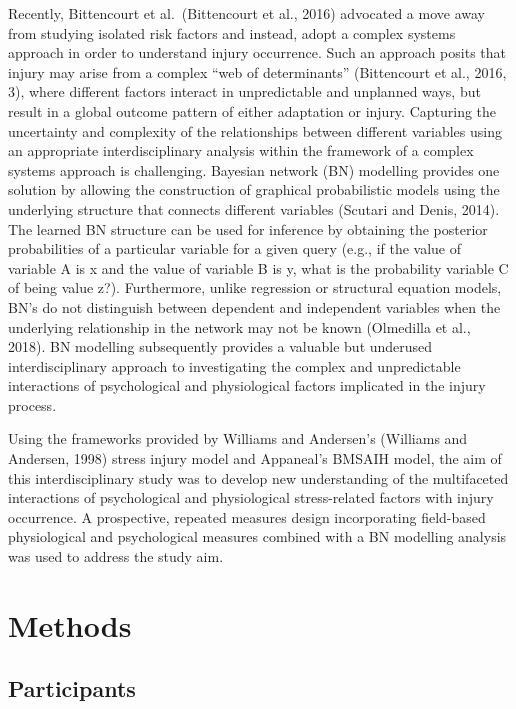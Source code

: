 \documentclass[
]{frontiersHLTH}
\begin{document}
Recently, Bittencourt et al.~(Bittencourt et al., 2016) advocated a move
away from studying isolated risk factors and instead, adopt a complex
systems approach in order to understand injury occurrence. Such an
approach posits that injury may arise from a complex ``web of
determinants'' (Bittencourt et al., 2016, 3), where different factors
interact in unpredictable and unplanned ways, but result in a global
outcome pattern of either adaptation or injury. Capturing the
uncertainty and complexity of the relationships between different
variables using an appropriate interdisciplinary analysis within the
framework of a complex systems approach is challenging. Bayesian network
(BN) modelling provides one solution by allowing the construction of
graphical probabilistic models using the underlying structure that
connects different variables (Scutari and Denis, 2014). The learned BN
structure can be used for inference by obtaining the posterior
probabilities of a particular variable for a given query (e.g., if the
value of variable A is x and the value of variable B is y, what is the
probability variable C of being value z?). Furthermore, unlike
regression or structural equation models, BN's do not distinguish
between dependent and independent variables when the underlying
relationship in the network may not be known (Olmedilla et al., 2018).
BN modelling subsequently provides a valuable but underused
interdisciplinary approach to investigating the complex and
unpredictable interactions of psychological and physiological factors
implicated in the injury process.

Using the frameworks provided by Williams and Andersen's (Williams and
Andersen, 1998) stress injury model and Appaneal's BMSAIH model, the aim
of this interdisciplinary study was to develop new understanding of the
multifaceted interactions of psychological and physiological
stress-related factors with injury occurrence. A prospective, repeated
measures design incorporating field-based physiological and
psychological measures combined with a BN modelling analysis was used to
address the study aim.

\section{Methods}

\subsection{Participants}
\end{document}
